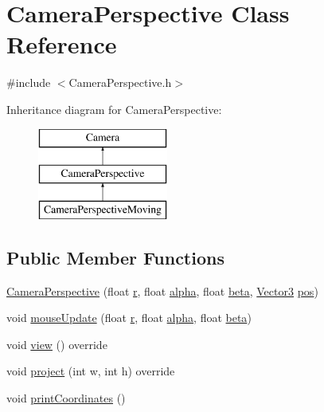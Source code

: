 \hypertarget{class_camera_perspective}{}\section{Camera\+Perspective Class Reference}
\label{class_camera_perspective}


{\ttfamily \#include $<$Camera\+Perspective.\+h$>$}

Inheritance diagram for Camera\+Perspective\+:\begin{figure}[H]
\begin{center}
\leavevmode
\includegraphics[height=3.000000cm]{class_camera_perspective}
\end{center}
\end{figure}
\subsection*{Public Member Functions}
\begin{DoxyCompactItemize}
\item 
\hyperlink{class_camera_perspective_a44735f45c240e39cd10dcae59dc752d3}{Camera\+Perspective} (float \hyperlink{class_camera_perspective_adb49aa14a62f537f810038351b141a36}{r}, float \hyperlink{class_camera_perspective_a93009a48069d0d671317c5d9f7d66963}{alpha}, float \hyperlink{class_camera_perspective_a3545402762e444abd3cb90ea9d2e72ca}{beta}, \hyperlink{class_vector3}{Vector3} \hyperlink{class_camera_a2c4c5bcf8f5885968d4e5ebc28074846}{pos})
\item 
void \hyperlink{class_camera_perspective_aaaa30cbae530a2d4716a3f333df2d240}{mouse\+Update} (float \hyperlink{class_camera_perspective_adb49aa14a62f537f810038351b141a36}{r}, float \hyperlink{class_camera_perspective_a93009a48069d0d671317c5d9f7d66963}{alpha}, float \hyperlink{class_camera_perspective_a3545402762e444abd3cb90ea9d2e72ca}{beta})
\item 
void \hyperlink{class_camera_perspective_a6605f8288ea01b0d647213df88d2a45b}{view} () override
\item 
void \hyperlink{class_camera_perspective_a841f648f4131897ec632cfcb55facf97}{project} (int w, int h) override
\item 
void \hyperlink{class_camera_perspective_a3e3875dbaf831674e33e5aee8d179224}{print\+Coordinates} ()
\end{DoxyCompactItemize}
